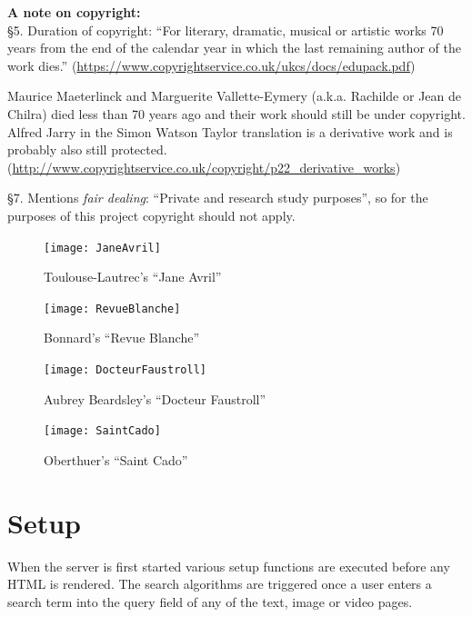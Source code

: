 \begin{fmpage}{\linewidth}
  \textbf{A note on copyright:}\\
  §5. Duration of copyright: ``For literary, dramatic, musical or artistic works 70 years from the end of the calendar year in which the last remaining author of the work dies.'' (\url{https://www.copyrightservice.co.uk/ukcs/docs/edupack.pdf})

  Maurice Maeterlinck and Marguerite Vallette-Eymery (a.k.a. Rachilde or Jean de Chilra) died less than 70 years ago and their work should still be under copyright. Alfred Jarry in the Simon Watson Taylor translation is a derivative work and is probably also still protected.  (\url{http://www.copyrightservice.co.uk/copyright/p22_derivative_works})

  §7. Mentions \emph{fair dealing}: ``Private and research study purposes'', so for the purposes of this project copyright should not apply.
\end{fmpage}

\begin{figure}[htbp]
  \centering
  \texttt{[image: JaneAvril]}
  \caption[Toulouse-Lautrec's ``Jane Avril'']{Toulouse-Lautrec's ``Jane Avril''}
\label{fig:toulouse}
\end{figure}

\begin{figure}[htbp]
  \centering
  \texttt{[image: RevueBlanche]}
  \caption[Bonnard's ``Revue Blanche'']{Bonnard's ``Revue Blanche''}
\label{fig:bonnard}
\end{figure}

\begin{figure}[htbp]
  \centering
  \texttt{[image: DocteurFaustroll]}
  \caption[Aubrey Beardsley's ``Docteur Faustroll'']{Aubrey Beardsley's ``Docteur Faustroll''}
\label{fig:beardsley}
\end{figure}

\begin{figure}[htbp]
  \centering
  \texttt{[image: SaintCado]}
  \caption[Oberthuer's ``Saint Cado'']{Oberthuer's ``Saint Cado''}
\label{fig:oberthuer}
\end{figure}


\section{Setup}

When the server is first started various setup functions are executed before any HTML is rendered. The search algorithms are triggered once a user enters a search term into the query field of any of the text, image or video pages.

